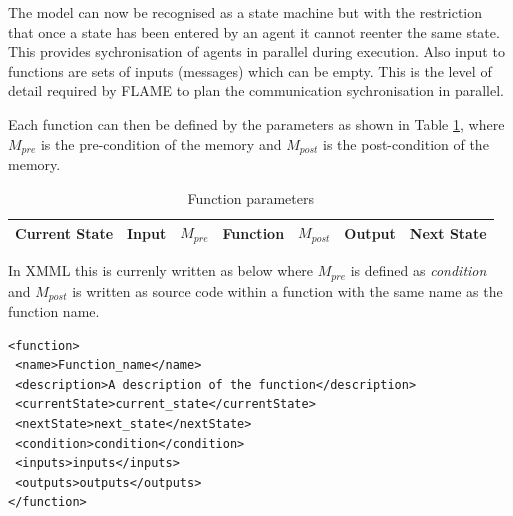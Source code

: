 The model can now be recognised as a state machine but with the restriction
that once a state has been entered by an agent it cannot reenter the same
state. This provides sychronisation of agents in parallel during execution. Also
input to functions are sets of inputs (messages) which can be empty. This is
the level of detail required by FLAME to plan the communication sychronisation
in parallel.

Each function can then be defined by the parameters as shown in Table
\ref{tab:funcparameters}, where $M_{pre}$ is the pre-condition of the memory
and $M_{post}$ is the post-condition of the memory.

\begin{table}[hbp]
\centering
\begin{tabular}{|l|l|l||l||l|l|l|}
\hline
Current State&Input&$M_{pre}$&Function&$M_{post}$&Output&Next State\\
\hline
\end{tabular}
\caption{Function parameters} \label{tab:funcparameters}
\end{table}

In XMML this is currenly written as below where $M_{pre}$ is defined as
\textit{condition} and $M_{post}$ is written as source code within a function
with the same name as the function name.

\begin{mylisting}
\begin{verbatim}
<function>
 <name>Function_name</name>
 <description>A description of the function</description>
 <currentState>current_state</currentState>
 <nextState>next_state</nextState>
 <condition>condition</condition>
 <inputs>inputs</inputs>
 <outputs>outputs</outputs>
</function>
\end{verbatim}
\end{mylisting}

